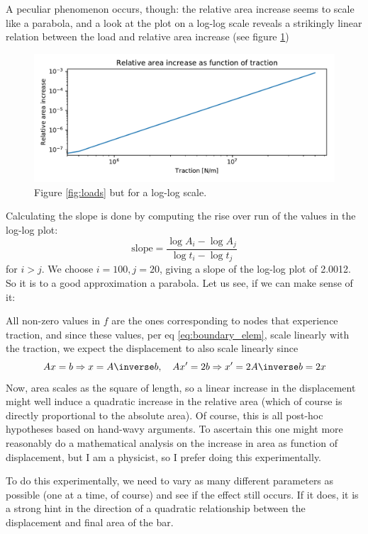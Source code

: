 \documentclass[sigconf]{acmart}
\begin{document}
A peculiar phenomenon occurs, though: the relative area increase seems to scale like a parabola, and a look at the plot on a log-log scale reveals a strikingly linear relation between the load and relative area increase (see figure \ref{fig:logloads})
\begin{figure}
	\centering
	\includegraphics[width=\linewidth]{ex_logloads.pdf}
	\caption{Figure \ref{fig:loads} but for a log-log scale.}
	\label{fig:logloads}
\end{figure}
Calculating the slope is done by computing the rise over run of the values in the log-log plot:
\begin{equation}\label{eq:slope}
	\text{slope} = \frac{\log A_i - \log A_j}{\log t_i - \log t_j}
\end{equation}
for $ i > j $. We choose $ i=100, j=20 $, giving a slope of the log-log plot of 2.0012. So it is to a good approximation a parabola. Let us see, if we can make sense of it:

All non-zero values in $ f $ are the ones corresponding to nodes that experience traction, and since these values, per eq \ref{eq:boundary_elem}, scale linearly with the traction, we expect the displacement to also scale linearly since
\begin{equation*}\label{key}
	Ax=b \Rightarrow x = A\inverse b, \quad Ax' = 2b \Rightarrow x'=2A\inverse b = 2x
\end{equation*}
Now, area scales as the square of length, so a linear increase in the displacement might well induce a quadratic increase in the relative area (which of course is directly proportional to the absolute area). Of course, this is all post-hoc hypotheses based on hand-wavy arguments. To ascertain this one might more reasonably do a mathematical analysis on the increase in area as function of displacement, but I am a physicist, so I prefer doing this experimentally.

To do this experimentally, we need to vary as many different parameters as possible (one at a time, of course) and see if the effect still occurs. If it does, it is a strong hint in the direction of a quadratic relationship between the displacement and final area of the bar.
\end{document}
